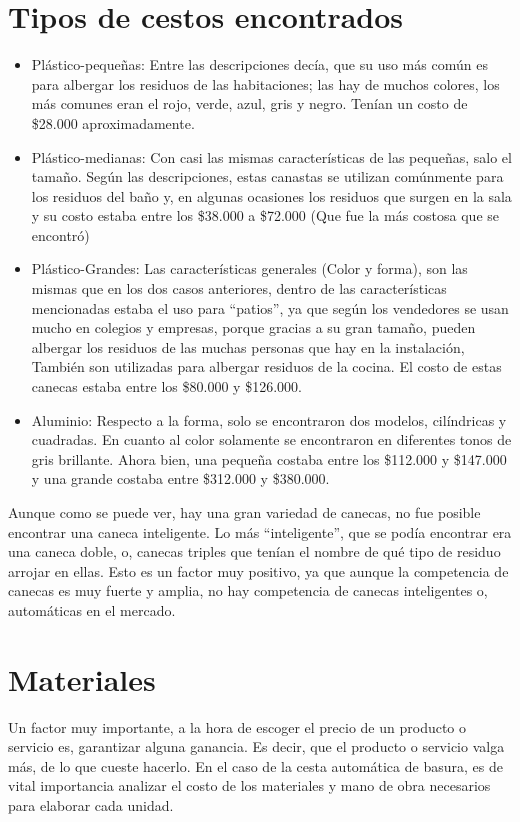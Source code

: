\documentclass[letterpaper,12pt]{scrreprt}
\begin{document}
    \section{Tipos de cestos encontrados}
        \begin{itemize}
        \item Plástico-pequeñas: Entre las descripciones decía, que su uso más común es para albergar los residuos de las habitaciones; las hay de muchos colores, los más comunes eran el rojo, verde, azul, gris y negro. Tenían un costo de \$28.000 aproximadamente.

        \item Plástico-medianas: Con casi las mismas características de las pequeñas, salo el tamaño. Según las descripciones, estas canastas se utilizan comúnmente para los residuos del baño y, en algunas ocasiones los residuos que surgen en la sala y su costo estaba entre los \$38.000 a \$72.000 (Que fue la más costosa que se encontró)

        \item Plástico-Grandes: Las características generales (Color y forma), son las mismas que en los dos casos anteriores, dentro de las características mencionadas estaba el uso para “patios”, ya que según los vendedores se usan mucho en colegios y empresas, porque gracias a su gran tamaño, pueden albergar los residuos de las muchas personas que hay en la instalación, También son utilizadas para albergar residuos de la cocina. El costo de estas canecas estaba entre los \$80.000 y \$126.000.

        \item Aluminio: Respecto a la forma, solo se encontraron dos modelos, cilíndricas y cuadradas. En cuanto al color solamente se encontraron en diferentes tonos de gris brillante. Ahora bien, una pequeña costaba entre los \$112.000 y \$147.000 y una grande costaba entre \$312.000 y \$380.000.


        \end{itemize}

    Aunque como se puede ver, hay una gran variedad de canecas, no fue posible encontrar una caneca inteligente. Lo más “inteligente”, que se podía encontrar era una caneca doble, o, canecas triples que tenían el nombre de qué tipo de residuo arrojar en ellas. Esto es un factor muy positivo, ya que aunque la competencia de canecas es muy fuerte y amplia, no hay competencia de canecas inteligentes o, automáticas en el mercado.

    \section{Materiales}
    Un factor muy importante, a la hora de escoger el precio de un producto o servicio es, garantizar alguna ganancia. Es decir, que el producto o servicio valga más, de lo que cueste hacerlo. En el caso de la cesta automática de basura, es de vital importancia analizar el costo de los materiales y mano de obra necesarios para elaborar cada unidad.
\end{document}
